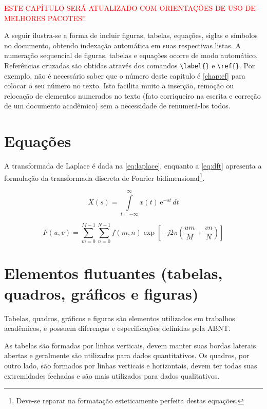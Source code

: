 \textcolor{red}{\large ESTE CAPÍTULO SERÁ ATUALIZADO COM ORIENTAÇÕES DE USO DE MELHORES PACOTES!!}

A seguir ilustra-se a forma de incluir figuras, tabelas, equações, siglas e 
símbolos no documento, obtendo indexação automática em suas respectivas
                listas.
A numeração sequencial de figuras, tabelas e equações ocorre de modo automático.
Referências cruzadas são obtidas através dos comandos \verb#\label{}# e \verb#\ref{}#.
Por exemplo, não é necessário saber que o número deste capítulo é \ref{chap:ef} para colocar o seu número no texto.
Isto facilita muito a inserção, remoção ou relocação de elementos numerados no texto (fato corriqueiro na escrita e correção de um documento acadêmico) sem a necessidade de renumerá-los todos.





 
\section{Equações}
\label{sec:equacoes}

A transformada de Laplace é dada na \autoref{eq:laplace}, enquanto a \autoref{eq:dft} apresenta a formulação da transformada discreta de Fourier bidimensional\footnote{Deve-se reparar na formatação esteticamente perfeita destas equações.}.


\begin{equation}
    X(s) = \int\limits_{t = -\infty}^{\infty} x(t) \, \text{e}^{-st} \, dt
    \label{eq:laplace}
\end{equation}

\begin{equation}
    F(u, v) = \sum_{m = 0}^{M - 1} \sum_{n = 0}^{N - 1} f(m, n) \exp \left[ -j 2 \pi \left( \frac{u m}{M} + \frac{v n}{N} \right) \right]
    \label{eq:dft}
\end{equation}


\section{Elementos flutuantes (tabelas, quadros, gráficos e figuras)}

Tabelas, quadros, gráficos e figuras são elementos utilizados em trabalhos acadêmicos, e possuem diferenças e especificações definidas pela ABNT.

As tabelas são formadas por linhas verticais, devem manter suas bordas laterais abertas e geralmente são utilizadas para dados quantitativos. Os quadros, por outro lado, são formados por linhas verticais e horizontais, devem ter todas suas extremidades fechadas e são mais utilizados para dados qualitativos.

